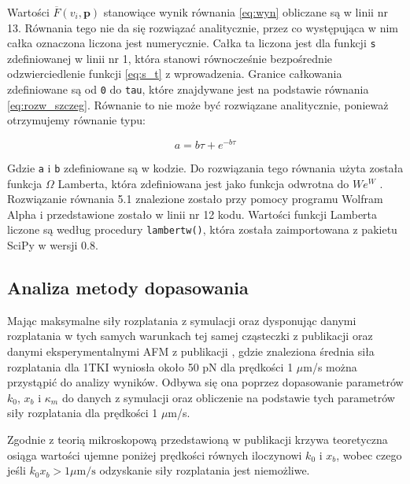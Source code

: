 Wartości $\overline{F}(v_i, \mathbf{p})$ stanowiące wynik równania \ref{eq:wyn} obliczane są w linii nr 13. Równania tego nie da się rozwiązać analitycznie, przez co występująca w nim całka oznaczona liczona jest numerycznie. Całka ta liczona jest dla funkcji \texttt{s} zdefiniowanej w linii nr 1, która stanowi równocześnie bezpośrednie odzwierciedlenie funkcji \ref{eq:s_t} z wprowadzenia. Granice całkowania zdefiniowane są od \texttt{0} do \texttt{tau}, które znajdywane jest na podstawie równania \ref{eq:rozw_szczeg}. Równanie to nie może być rozwiązane analitycznie, ponieważ otrzymujemy równanie typu:

\begin{equation}
a=b\tau + e^{-b\tau}
\label{eq:omega}
\end{equation} 

Gdzie \texttt{a} i \texttt{b} zdefiniowane są w kodzie. Do rozwiązania tego równania użyta została funkcja $\Omega$ Lamberta, która zdefiniowana jest jako funkcja odwrotna do $W e^W$ \cite{lambert}. Rozwiązanie równania 5.1 znalezione zostało przy pomocy programu Wolfram Alpha\cite{wolfram} i przedstawione zostało w linii nr 12 kodu. Wartości funkcji Lamberta liczone są według procedury \texttt{lambertw()}, która została zaimportowana z pakietu SciPy w wersji 0.8\cite{Scipy}.

\subsection{Analiza metody dopasowania}

Mając maksymalne siły rozplatania z symulacji oraz dysponując danymi rozplatania w tych samych warunkach tej samej cząsteczki z publikacji \cite{1tki} oraz danymi eksperymentalnymi AFM z publikacji \cite{mechanoenz}, gdzie znaleziona średnia siła rozplatania dla 1TKI wyniosła około 50 pN dla prędkości 1 $\mu$m/s można przystąpić do analizy wyników. Odbywa się ona poprzez dopasowanie parametrów  $k_0$, $x_b$ i $\kappa_m$ do danych z symulacji oraz obliczenie na podstawie tych parametrów siły rozplatania dla prędkości 1 $\mu$m/s.

Zgodnie z teorią mikroskopową przedstawioną w publikacji \cite{Hummer_Szabo_2003} krzywa teoretyczna osiąga wartości ujemne poniżej prędkości równych iloczynowi $k_0$ i $x_b$, wobec czego jeśli $k_0 x_b > 1 \mu\text{m/s}$ odzyskanie siły rozplatania jest niemożliwe.

